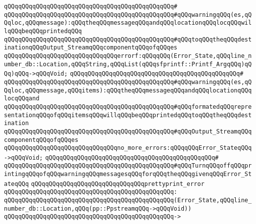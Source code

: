 \verb|qQQqqQQqqQQqqQQqqQQqqQQqqQQqqQQqqQQqqQQqqQQqqQQq#|\newline
\verb|qQQqqQQqqQQqqQQqqQQqqQQqqQQqqQQqqQQqqQQqqQQqqQQq#qQQqwarningqQQq(es,qQQqloc,qQQqmessage):qQQqtheqQQqmessageqQQqandqQQqlocationqQQqlocqQQqwillqQQqbeqQQqprintedqQQq|\newline
\verb|qQQqqQQqqQQqqQQqqQQqqQQqqQQqqQQqqQQqqQQqqQQqqQQq#qQQqtoqQQqtheqQQqdestinationqQQqOutput_StreamqQQqcomponentqQQqofqQQqes|\newline
\newline
\verb|qQQqqQQqqQQqqQQqqQQqqQQqqQQqqQQqerrorf:qQQqqQQq(Error_State,qQQqline_number_db::Location,qQQqString,qQQqList(qQQqsfprintf::Printf_ArgqQQq)qQQq)qQQq->qQQqVoid;|\newline
\verb|qQQqqQQqqQQqqQQqqQQqqQQqqQQqqQQqqQQqqQQqqQQqqQQq#|\newline
\verb|qQQqqQQqqQQqqQQqqQQqqQQqqQQqqQQqqQQqqQQqqQQqqQQq#qQQqwarningqQQq(es,qQQqloc,qQQqmessage,qQQqitems):qQQqtheqQQqmessageqQQqandqQQqlocationqQQqlocqQQqand|\newline
\verb|qQQqqQQqqQQqqQQqqQQqqQQqqQQqqQQqqQQqqQQqqQQqqQQq#qQQqformatedqQQqrepresentationqQQqofqQQqitemsqQQqwillqQQqbeqQQqprintedqQQqtoqQQqtheqQQqdestination|\newline
\verb|qQQqqQQqqQQqqQQqqQQqqQQqqQQqqQQqqQQqqQQqqQQqqQQq#qQQqOutput_StreamqQQqcomponentqQQqofqQQqes|\newline
\newline
\newline
\verb|qQQqqQQqqQQqqQQqqQQqqQQqqQQqqQQqno_more_errors:qQQqqQQqError_StateqQQq->qQQqVoid;|\newline
\verb|qQQqqQQqqQQqqQQqqQQqqQQqqQQqqQQqqQQqqQQqqQQqqQQq#|\newline
\verb|qQQqqQQqqQQqqQQqqQQqqQQqqQQqqQQqqQQqqQQqqQQqqQQq#qQQqTurnqQQqoffqQQqprintingqQQqofqQQqwarningqQQqmessagesqQQqforqQQqtheqQQqgivenqQQqError_StateqQQq|\newline
\newline
\newline
\newline
\verb|qQQqqQQqqQQqqQQqqQQqqQQqqQQqqQQqprettyprint_error|\newline
\verb|qQQqqQQqqQQqqQQqqQQqqQQqqQQqqQQqqQQqqQQqqQQqqQQq:|\newline
\verb|qQQqqQQqqQQqqQQqqQQqqQQqqQQqqQQqqQQqqQQqqQQqqQQq(Error_State,qQQqline_number_db::Location,qQQq(pp::PpstreamqQQq->qQQqVoid))|\newline
\verb|qQQqqQQqqQQqqQQqqQQqqQQqqQQqqQQqqQQqqQQqqQQqqQQq->|\newline
